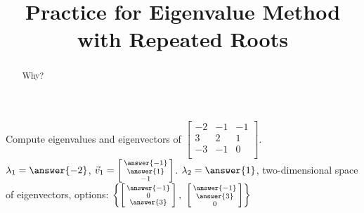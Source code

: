 \documentclass{ximera}
\title{Practice for Eigenvalue Method with Repeated Roots}
\begin{document}
\begin{abstract}
Why?
\end{abstract}
\maketitle



\begin{exercise}
    Compute eigenvalues and eigenvectors of
    $\left[ 
        \begin{smallmatrix}
            -2 & -1 & -1 \\
            3 & 2 & 1 \\
            -3 & -1 & 0 \\
        \end{smallmatrix} 
    \right]$.\\
    $\lambda_1 = \answer{-2}$, $\vec{v}_1 = \left[\begin{smallmatrix} \answer{-1} \\ \answer{1} \\ -1 \end{smallmatrix}\right]$. $\lambda_2 = \answer{1}$, two-dimensional space of eigenvectors, options: $\left\{ \left[\begin{smallmatrix} \answer{-1} \\ 0 \\ \answer{3} \end{smallmatrix}\right],\ \left[\begin{smallmatrix} \answer{-1} \\ \answer{3} \\ 0 \end{smallmatrix}\right]\right\}$
\end{exercise}
\end{document}
